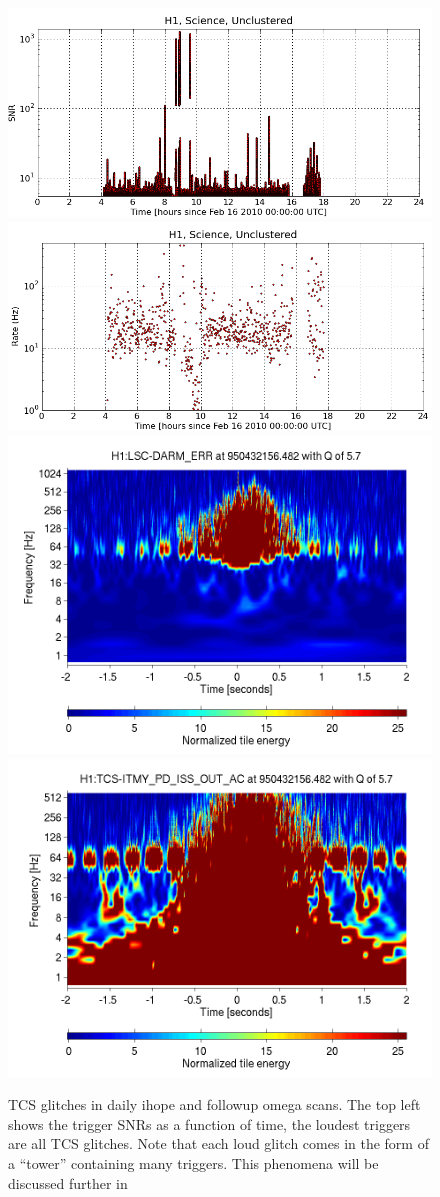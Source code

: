 \begin{figure}
  \includegraphics[width=0.5\linewidth]{figures/detchar/20100217_H1_0_UNCLUSTERED_snr_vs_time} 
  \includegraphics[width=0.5\linewidth]{figures/detchar/20100217_H1_0_UNCLUSTERED_rate_vs_time} \\
  \includegraphics[width=0.5\linewidth]{figures/detchar/950432156_482177734_H1_LSC-DARM_ERR_4_00_spectrogram_whitened}
  \includegraphics[width=0.5\linewidth]{figures/detchar/950432156_482177734_H1_TCS-ITMY_PD_ISS_OUT_AC_4_00_spectrogram_whitened}
  \caption[TCS glitch in daily ihope and omega]{
  \label{f:daily_ihope_tcs}
TCS glitches in daily ihope and followup omega scans.  The top left
shows the trigger SNRs as a function of time, the loudest triggers are all TCS
glitches.  Note that each loud glitch comes in the form of a ``tower''
containing many triggers.  This phenomena will be discussed further in
}
\end{figure}
